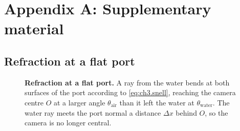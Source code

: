 
\chapter*{Appendix A: Supplementary material}
\setcounter{chapter}{0}
\label{app:supplementary}

\section*{Refraction at a flat port}
{}
\label{app:snell_port}
\begin{figure}[H]
	\centering
	
	\caption[Refraction at a flat port]{\textbf{Refraction at a flat port.}
	A ray from the water bends at both surfaces of the port according to \autoref{eq:ch3.snell}, reaching the camera
	 centre $O$ at a larger angle $\theta_\text{air}$ than it left the water at $\theta_\text{water}$. The water ray meets the port normal a distance $\Delta x$ behind $O$, so the camera is no longer central.}
	\label{fig:ch3.snell_port}
\end{figure}

